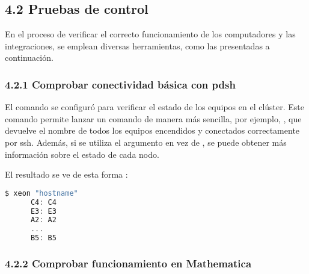 \begin{spacing}{1.5}
  \subsection{4.2 Pruebas de control}

  En el proceso de verificar el correcto funcionamiento de los computadores y las integraciones, se emplean diversas herramientas, como las presentadas a continuación.

  \subsubsection {4.2.1 Comprobar conectividad básica con pdsh}

  El comando  se configuró para verificar el estado de los equipos
  en
  el clúster. Este comando permite lanzar un comando de manera más sencilla,
  por
  ejemplo, , que devuelve el nombre de
  todos los
  equipos encendidos y conectados correctamente por ssh. Además, si se utiliza
  el
  argumento  en vez de , se puede obtener más
  información sobre el estado de cada nodo.

  El resultado se ve de esta forma :


  \begin{lstlisting}[language=C]
      $ xeon "hostname"
      C4: C4
      E3: E3
      A2: A2
      ...
      B5: B5
  \end{lstlisting}

  \subsubsection {4.2.2 Comprobar funcionamiento en Mathematica}


\end{spacing}
